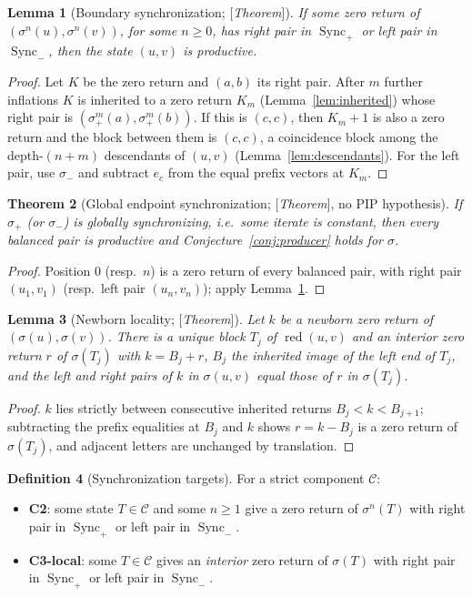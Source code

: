 \documentclass[11pt]{amsart}
\theoremstyle{plain}
\newtheorem{theorem}{Theorem}[section]
\newtheorem{lemma}[theorem]{Lemma}
\theoremstyle{definition}
\newtheorem{definition}[theorem]{Definition}
\theoremstyle{remark}
\newcommand{\cC}{\mathcal{C}}
\newcommand{\Sync}{\operatorname{Sync}}
\newcommand{\red}{\operatorname{red}}
\newcommand{\Status}[1]{\textup{[\textit{#1}]}}
\begin{document}
\begin{lemma}[Boundary synchronization; \Status{Theorem}]\label{lem:boundary-sync}
If some zero return of $(\sigma^n(u),\sigma^n(v))$, for some $n\ge0$, has right pair in $\Sync_+$ or left pair in $\Sync_-$, then the state $(u,v)$ is productive.
\end{lemma}
\begin{proof}
Let $K$ be the zero return and $(a,b)$ its right pair. After $m$ further inflations $K$ is inherited to a zero return $K_m$ (Lemma~\ref{lem:inherited}) whose right pair is $(\sigma_+^m(a),\sigma_+^m(b))$. If this is $(c,c)$, then $K_m+1$ is also a zero return and the block between them is $(c,c)$, a coincidence block among the depth-$(n+m)$ descendants of $(u,v)$ (Lemma~\ref{lem:descendants}). For the left pair, use $\sigma_-$ and subtract $e_c$ from the equal prefix vectors at $K_m$.
\end{proof}

\begin{theorem}[Global endpoint synchronization; \Status{Theorem}, no PIP hypothesis]\label{thm:global-sync}
If $\sigma_+$ (or $\sigma_-$) is globally synchronizing, i.e.\ some iterate is constant, then every balanced pair is productive and Conjecture~\ref{conj:producer} holds for $\sigma$.
\end{theorem}
\begin{proof}
Position $0$ (resp.\ $n$) is a zero return of every balanced pair, with right pair $(u_1,v_1)$ (resp.\ left pair $(u_n,v_n)$); apply Lemma~\ref{lem:boundary-sync}.
\end{proof}

\begin{lemma}[Newborn locality; \Status{Theorem}]\label{lem:locality}
Let $k$ be a newborn zero return of $(\sigma(u),\sigma(v))$. There is a unique block $T_j$ of $\red(u,v)$ and an interior zero return $r$ of $\sigma(T_j)$ with $k=B_j+r$, $B_j$ the inherited image of the left end of $T_j$, and the left and right pairs of $k$ in $\sigma(u,v)$ equal those of $r$ in $\sigma(T_j)$.
\end{lemma}
\begin{proof}
$k$ lies strictly between consecutive inherited returns $B_j<k<B_{j+1}$; subtracting the prefix equalities at $B_j$ and $k$ shows $r=k-B_j$ is a zero return of $\sigma(T_j)$, and adjacent letters are unchanged by translation.
\end{proof}

\begin{definition}[Synchronization targets]\label{def:C2C3}
For a strict component $\cC$:
\begin{itemize}[leftmargin=*]
\item \textbf{C2}: some state $T\in\cC$ and some $n\ge1$ give a zero return of $\sigma^n(T)$ with right pair in $\Sync_+$ or left pair in $\Sync_-$.
\item \textbf{C3-local}: some $T\in\cC$ gives an \emph{interior} zero return of $\sigma(T)$ with right pair in $\Sync_+$ or left pair in $\Sync_-$.
\end{itemize}
\end{definition}
\end{document}
